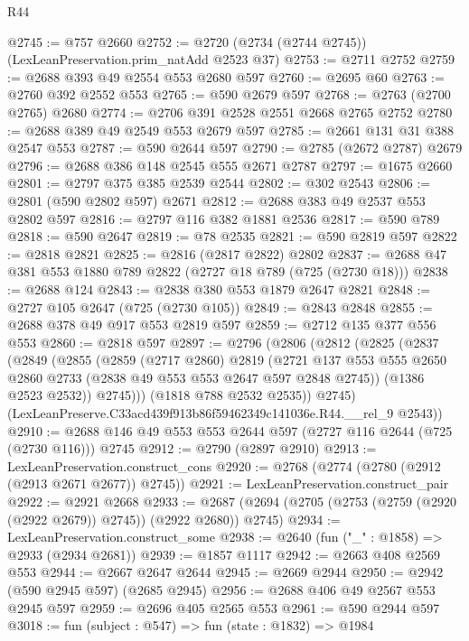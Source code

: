 \begin{lexlean}{R44}
\begin{coremodule}
@2745 := @757 @2660
@2752 := @2720 (@2734 (@2744 @2745)) (LexLeanPreservation.prim_natAdd @2523 @37)
@2753 := @2711 @2752
@2759 := @2688 @393 @49 @2554 @553 @2680 @597
@2760 := @2695 @60
@2763 := @2760 @392 @2552 @553
@2765 := @590 @2679 @597
@2768 := @2763 (@2700 @2765) @2680
@2774 := @2706 @391 @2528 @2551 @2668 @2765 @2752
@2780 := @2688 @389 @49 @2549 @553 @2679 @597
@2785 := @2661 @131 @31 @388 @2547 @553
@2787 := @590 @2644 @597
@2790 := @2785 (@2672 @2787) @2679
@2796 := @2688 @386 @148 @2545 @555 @2671 @2787
@2797 := @1675 @2660
@2801 := @2797 @375 @385 @2539 @2544
@2802 := @302 @2543
@2806 := @2801 (@590 @2802 @597) @2671
@2812 := @2688 @383 @49 @2537 @553 @2802 @597
@2816 := @2797 @116 @382 @1881 @2536
@2817 := @590 @789
@2818 := @590 @2647
@2819 := @78 @2535
@2821 := @590 @2819 @597
@2822 := @2818 @2821
@2825 := @2816 (@2817 @2822) @2802
@2837 := @2688 @47 @381 @553 @1880 @789 @2822 (@2727 @18 @789 (@725 (@2730 @18)))
@2838 := @2688 @124
@2843 := @2838 @380 @553 @1879 @2647 @2821
@2848 := @2727 @105 @2647 (@725 (@2730 @105))
@2849 := @2843 @2848
@2855 := @2688 @378 @49 @917 @553 @2819 @597
@2859 := @2712 @135 @377 @556 @553
@2860 := @2818 @597
@2897 := @2796
    (@2806
      (@2812
        (@2825
          (@2837
            (@2849
              (@2855
                (@2859
                  (@2717 @2860)
                  @2819
                  (@2721
                    @137
                    @553
                    @555
                    @2650
                    @2860
                    @2733
                    (@2838 @49 @553 @553 @2647 @597 @2848 @2745))
                  (@1386 @2523 @2532))
                @2745)))
          (@1818 @788 @2532 @2535))
        @2745)
      (LexLeanPreserve.C33acd439f913b86f59462349c141036e.R44.__rel_9 @2543))
@2910 := @2688 @146 @49 @553 @553 @2644 @597 (@2727 @116 @2644 (@725 (@2730 @116))) @2745
@2912 := @2790 (@2897 @2910)
@2913 := LexLeanPreservation.construct_cons
@2920 := @2768 (@2774 (@2780 (@2912 (@2913 @2671 @2677)) @2745))
@2921 := LexLeanPreservation.construct_pair
@2922 := @2921 @2668
@2933 := @2687 (@2694 (@2705 (@2753 (@2759 (@2920 (@2922 @2679)) @2745)) (@2922 @2680)) @2745)
@2934 := LexLeanPreservation.construct_some
@2938 := @2640 (fun ("_" : @1858) => @2933 (@2934 @2681))
@2939 := @1857 @1117
@2942 := @2663 @408 @2569 @553
@2944 := @2667 @2647 @2644
@2945 := @2669 @2944
@2950 := @2942 (@590 @2945 @597) (@2685 @2945)
@2956 := @2688 @406 @49 @2567 @553 @2945 @597
@2959 := @2696 @405 @2565 @553
@2961 := @590 @2944 @597
@3018 := fun (subject : @547) =>
  fun (state : @1832) =>
  @1984

\end{coremodule}
\end{lexlean}
